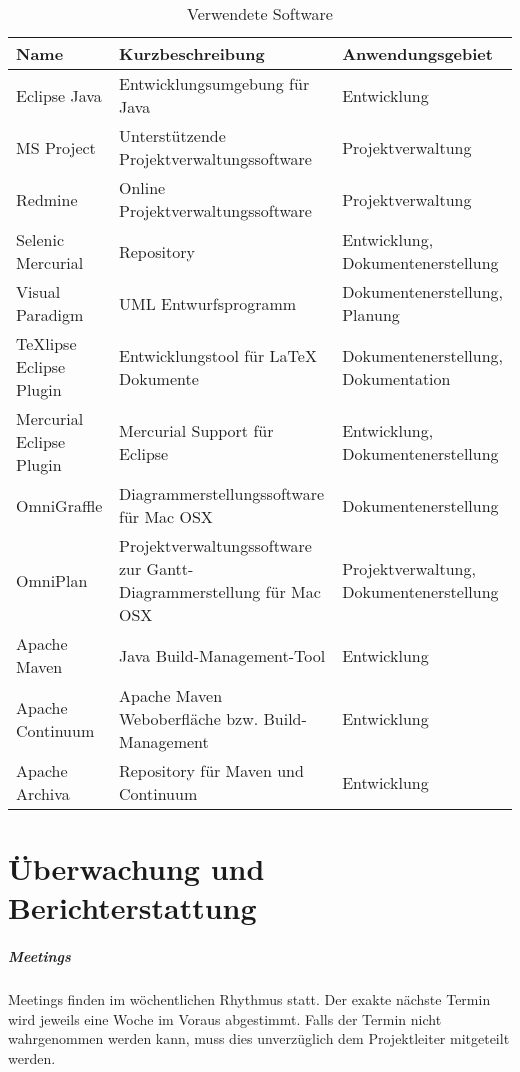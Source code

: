 \begin{table}[htdp]
\caption{Verwendete Software}
\label{tab:software}
\begin{center}
\begin{tabular}{|p{4.5cm}|p{5.5cm}|p{5cm}|}
\hline
\textbf{Name} & \textbf{Kurzbeschreibung} & \textbf{Anwendungsgebiet}\\
\hline
Eclipse Java & Entwicklungsumgebung für Java & Entwicklung \\
\hline
MS Project & Unterstützende Projektverwaltungssoftware & Projektverwaltung  \\
\hline
Redmine & Online Projektverwaltungssoftware & Projektverwaltung\\
\hline
Selenic Mercurial & Repository & Entwicklung, Dokumentenerstellung\\
\hline
Visual Paradigm & UML Entwurfsprogramm & Dokumentenerstellung, Planung\\
\hline
TeXlipse Eclipse Plugin & Entwicklungstool für LaTeX Dokumente &
Dokumentenerstellung, Dokumentation\\
\hline
Mercurial Eclipse Plugin & Mercurial Support für Eclipse & Entwicklung, 
Dokumentenerstellung\\
\hline
OmniGraffle & Diagrammerstellungssoftware für Mac OSX & Dokumentenerstellung\\
\hline
OmniPlan & Projektverwaltungssoftware zur Gantt-Diagrammerstellung für Mac OSX & Projektverwaltung, Dokumentenerstellung\\
\hline
Apache Maven & Java Build-Management-Tool & Entwicklung\\
\hline
Apache Continuum & Apache Maven Weboberfläche bzw. Build-Management & Entwicklung\\
\hline
Apache Archiva & Repository für Maven und Continuum & Entwicklung\\
\hline
\end{tabular}
\end{center}
\label{default}
\end{table}



\chapter{Überwachung und Berichterstattung}
\label{cha:über}

\paragraph{Meetings}
Meetings finden im wöchentlichen Rhythmus statt. Der exakte nächste Termin wird
jeweils eine Woche im Voraus abgestimmt. Falls der Termin nicht wahrgenommen
werden kann, muss dies unverzüglich dem Projektleiter mitgeteilt werden.
